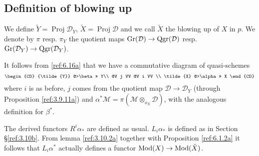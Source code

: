 \documentclass{amsproc}
\def\Dscr{{\mathcal D}}
\def\Mscr{{\mathcal M}}
\def\Mod{\mathop{\text{Mod}}}
\def\Gr{\mathop{\text{Gr}}}
\def\Proj{\operatorname {Proj}}
\def\Qgr{\operatorname {Qgr}}
\def\r{\rightarrow}
\let\oldtext\text
\def\text#1{\oldtext{\upshape #1}}
\theoremstyle{definition}
\theoremstyle{remark}
\numberwithin{equation}{section}
\numberwithin{table}{section}
\numberwithin{figure}{section}
\def\Gr{\mathop{\text{Gr}}}
\begin{document}
\subsection{Definition of blowing up}
\label{ref:6.3b}
We define ${\tilde{Y}}=\Proj \Dscr_Y$, $\tilde{X}=\Proj
\Dscr$  and we call $\tilde{X}$ the blowing up of $X$ in $p$. We
denote by $\pi$ resp. $\pi_Y$ the quotient maps $\Gr(\Dscr)\r
\Qgr({\Dscr})$ resp. $\Gr(\Dscr_Y)\r
\Qgr({\Dscr}_{Y})$. 


It follows from \eqref{ref:6.16a} that we have a commutative
diagram of quasi-schemes
\begin{equation}
\label{ref:6.20a}
\begin{CD}
{\tilde{Y}} @>\beta>> Y\\
@V j VV @V i VV \\
\tilde{X} @>\alpha >> X
\end{CD}
\end{equation}
where $i$ is as before, $j$ comes from the quotient map $\Dscr\r
\Dscr_Y$ (through Proposition \eqref{ref:3.9.11a}) and
$\alpha^\ast\Mscr=\pi(\Mscr\otimes_{o_X} \Dscr)$, with the analogous
definition for $\beta^\ast$.


The derived functors $R^i\alpha_\ast$ are defined as
usual. $L_i\alpha_\ast$ is defined as in Section
\S\ref{ref:3.10b}. From lemma \ref{ref:3.10.2a} together with
Proposition \ref{ref:6.1.2a} it follows that $L_i\alpha^\ast$ actually
defines a functor $\Mod(X)\r \Mod({\tilde{X}})$.
\end{document}
